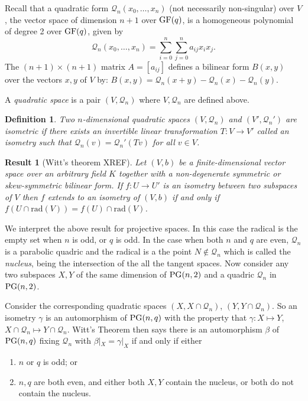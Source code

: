 \documentclass[12pt]{article}
\newtheorem{definition}[theorem]{Definition}
\newtheorem{result}[theorem]{Result}
\newcommand{\Q}{\mathscr Q}
\newcommand\GF{{\rm GF}}
\newcommand\PG{{\rm PG}}
\begin{document}
Recall that a quadratic form $\Q_n(x_0,\ldots,x_n)$ (not necessarily non-singular) over $V$, the vector space of dimension $n+1$ over $\GF(q)$, is a homogeneous polynomial of degree 2 over $\GF(q)$, given by
\[
\Q_n(x_0,\ldots,x_n)=\sum_{i=0}^n\sum_{j=0}^n a_{ij}x_ix_j.
\]
The  $(n+1)\times(n+1)$ matrix $A=[a_{ij}]$ defines a bilinear form $B(x,y)$ over the vectors $x,y$ of $V$ by: $B(x,y)=\Q_n(x+y)-\Q_n(x)-\Q_n(y)$.

A \emph{quadratic space} is a pair $(V,\Q_n)$ where $V,\Q_n$ are defined above.

\begin{definition}
Two $n$-dimensional quadratic spaces $(V, \Q_n)$ and $(V', \Q_n')$ are \emph{isometric} if there exists an invertible linear transformation $T \colon V \rightarrow V'$ called an \emph{isometry} such that $\Q_n(v)=\Q_n'(Tv)$ for all $v\in V$.
\end{definition}

\begin{result}[Witt's theorem XREF]
Let $(V, b)$ be a finite-dimensional vector space over an arbitrary field $K$ together with a non-degenerate symmetric or skew-symmetric bilinear form. If $f\colon U\rightarrow U'$ is an isometry between two subspaces of $V$ then $f$ extends to an isometry of $(V,b)$ if and only if $f( U\cap\mbox{rad}(V))=f( U)\cap\mbox{rad}(V)$.
\end{result}
We interpret the above result for projective spaces. In this case the radical is the empty set when $n$ is odd, or $q$ is odd.  In the case when both $n$ and $q$ are even, $\Q_n$ is a parabolic quadric and the radical is a the point $N\not\in\Q_n$ which is called the \emph{nucleus}, being the intersection of the all the tangent spaces. Now consider any two subspaces  $X,Y$ of the same dimension of $\PG(n,2)$ and a quadric $\Q_n$ in $\PG(n,2)$.


Consider the corresponding quadratic spaces $(X,X\cap \Q_n)$, $(Y,Y\cap \Q_n)$. So an isometry $\gamma$ is an automorphism of $\PG(n,q)$ with the property that $\gamma\colon X\mapsto Y$, $X\cap\Q_n\mapsto Y\cap\Q_n$.  Witt's Theorem then says there is an automorphism $\beta$ of $\PG(n,q)$ fixing $\Q_n$ with  $\beta|_X=\gamma|_X$ if and only if either 
\begin{enumerate}
\item $n$ or $q$ is odd; or
\item $n,q$ are both even, and either both $X,Y$ contain the nucleus, or both do not contain the nucleus.
\end{enumerate}
\end{document}
